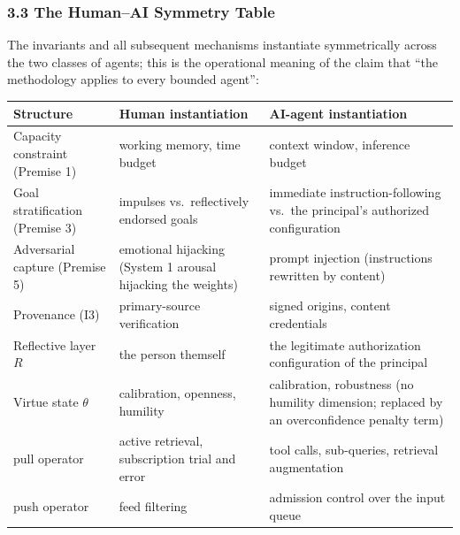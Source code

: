 \documentclass[
  11pt]{article}
\begin{document}
\subsubsection{3.3 The Human--AI Symmetry
Table}\label{the-humanai-symmetry-table}

The invariants and all subsequent mechanisms instantiate symmetrically
across the two classes of agents; this is the operational meaning of the
claim that ``the methodology applies to every bounded agent'':

\begin{longtable}[]{@{}
  >{\raggedright\arraybackslash}p{}
  >{\raggedright\arraybackslash}p{}
  >{\raggedright\arraybackslash}p{}@{}}
\toprule\noalign{}
\begin{minipage}[b]{\linewidth}\raggedright
Structure
\end{minipage} & \begin{minipage}[b]{\linewidth}\raggedright
Human instantiation
\end{minipage} & \begin{minipage}[b]{\linewidth}\raggedright
AI-agent instantiation
\end{minipage} \\
\midrule\noalign{}
\endhead
\bottomrule\noalign{}
\endlastfoot
Capacity constraint (Premise 1) & working memory, time budget & context
window, inference budget \\
Goal stratification (Premise 3) & impulses vs.~reflectively endorsed
goals & immediate instruction-following vs.~the principal's authorized
configuration \\
Adversarial capture (Premise 5) & emotional hijacking (System 1 arousal
hijacking the weights) & prompt injection (instructions rewritten by
content) \\
Provenance (I3) & primary-source verification & signed origins, content
credentials \\
Reflective layer \(R\) & the person themself & the legitimate
authorization configuration of the principal \\
Virtue state \(\theta\) & calibration, openness, humility & calibration,
robustness (no humility dimension; replaced by an overconfidence penalty
term) \\
pull operator & active retrieval, subscription trial and error & tool
calls, sub-queries, retrieval augmentation \\
push operator & feed filtering & admission control over the input
queue \\
\end{longtable}
\end{document}
